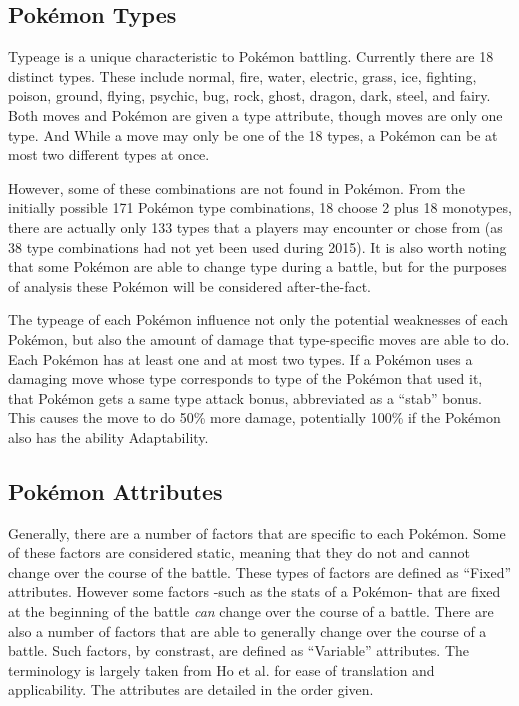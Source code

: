 \documentclass[12pt,twoside]{reedthesis}
\begin{document}
  \subsection{Pokémon Types}\label{pokemon-types}
  
  Typeage is a unique characteristic to Pokémon battling. Currently there
  are 18 distinct types. These include normal, fire, water, electric,
  grass, ice, fighting, poison, ground, flying, psychic, bug, rock, ghost,
  dragon, dark, steel, and fairy. Both moves and Pokémon are given a type
  attribute, though moves are only one type. And While a move may only be
  one of the 18 types, a Pokémon can be at most two different types at
  once.
  
  However, some of these combinations are not found in Pokémon. From the
  initially possible 171 Pokémon type combinations, 18 choose 2 plus 18
  monotypes, there are actually only 133 types that a players may
  encounter or chose from (as 38 type combinations had not yet been used
  during 2015). It is also worth noting that some Pokémon are able to
  change type during a battle, but for the purposes of analysis these
  Pokémon will be considered after-the-fact.
  
  The typeage of each Pokémon influence not only the potential weaknesses
  of each Pokémon, but also the amount of damage that type-specific moves
  are able to do. Each Pokémon has at least one and at most two types. If
  a Pokémon uses a damaging move whose type corresponds to type of the
  Pokémon that used it, that Pokémon gets a same type attack bonus,
  abbreviated as a ``stab'' bonus. This causes the move to do 50\% more
  damage, potentially 100\% if the Pokémon also has the ability
  Adaptability.
  
  \subsection{Pokémon Attributes}\label{pokemon-attributes}
  
  Generally, there are a number of factors that are specific to each
  Pokémon. Some of these factors are considered static, meaning that they
  do not and cannot change over the course of the battle. These types of
  factors are defined as ``Fixed'' attributes. However some factors -such
  as the stats of a Pokémon- that are fixed at the beginning of the battle
  \emph{can} change over the course of a battle. There are also a number
  of factors that are able to generally change over the course of a
  battle. Such factors, by constrast, are defined as ``Variable''
  attributes. The terminology is largely taken from Ho et al. for ease of
  translation and applicability. The attributes are detailed in the order
  given.
  
\end{document}

